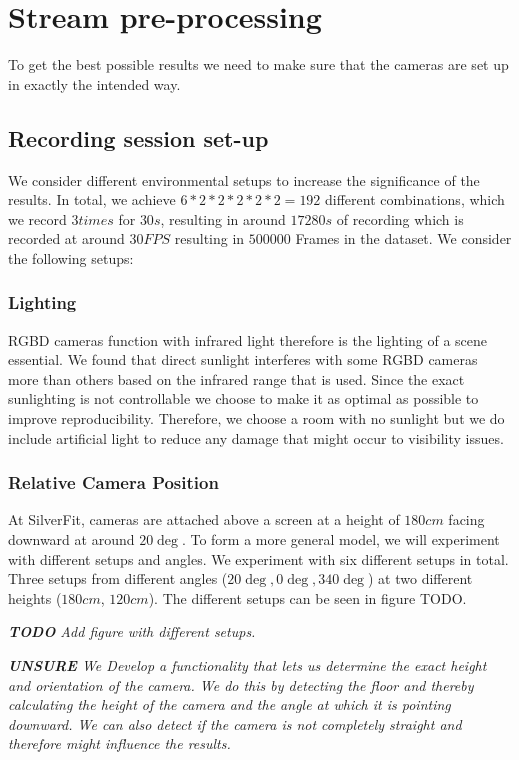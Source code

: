 \section{Stream pre-processing}

To get the best possible results we need to make sure that the cameras are set up in exactly the intended way. 

\subsection{Recording session set-up}

We consider different environmental setups to increase the significance of the results. In total, we achieve $6 * 2 * 2 * 2 * 2 * 2 = 192$ different combinations, which we record $3 times$ for $30s$, resulting in around $17280s$ of recording which is recorded at around $30 FPS$ resulting in $500000$ Frames in the dataset. We consider the following setups:

\subsubsection{Lighting}

RGBD cameras function with infrared light therefore is the lighting of a scene essential. We found that direct sunlight interferes with some RGBD cameras more than others based on the infrared range that is used. Since the exact sunlighting is not controllable we choose to make it as optimal as possible to improve reproducibility. Therefore, we choose a room with no sunlight but we do include artificial light to reduce any damage that might occur to visibility issues.

\subsubsection{Relative Camera Position}

At SilverFit, cameras are attached above a screen at a height of $180 cm$ facing downward at around $20\deg$. To form a more general model, we will experiment with different setups and angles. We experiment with six different setups in total. Three setups from different angles ($20\deg, 0\deg, 340\deg$) at two different heights ($180cm$, $120cm$). The different setups can be seen in figure TODO.

\textit{\textbf{TODO} Add figure with different setups.}

\textit{
  \textbf{UNSURE} We Develop a functionality that lets us determine the exact height and orientation of the camera. We do this by detecting the floor and thereby calculating the height of the camera and the angle at which it is pointing downward. We can also detect if the camera is not completely straight and therefore might influence the results.
}


